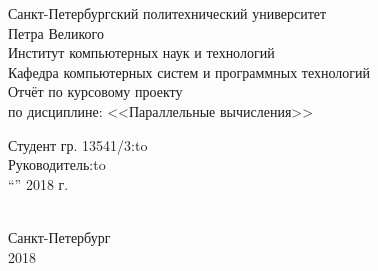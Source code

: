 \documentclass[utf8x, 14pt]{article}
\begin{document}
	
\begin{center} 
	
	\large Санкт-Петербургский политехнический университет \\Петра Великого\\
	Институт компьютерных наук и технологий\\
	Кафедра компьютерных систем и программных технологий\\[5.5cm] 
	
	\huge Отчёт по курсовому проекту \\[0.6cm] %
	\large по дисциплине: <<Параллельные вычисления>>\\[3.7cm]
	
	
\end{center} 

\newbox{\lbox}
\newlength{\maxl}
\setlength{\maxl}{\wd\lbox}
\hfill\parbox{10cm}{
	\hspace*{4cm}\hspace*{-4cm}Студент гр. 13541/3:\hfill\hbox to\\
	\hspace*{4cm}\hspace*{-4cm}Руководитель:\hfill\hbox to\\
	\newline
	\hspace*{5cm}“\underline{\qquad}” \underline{\qquad\qquad} 2018 г.\\
	\\
}

\vfill 

\begin{center} 
	\large Санкт-Петербург\\2018
\end{center} 

\thispagestyle{empty}
\newpage

\tableofcontents

\newpage
\end{document}
